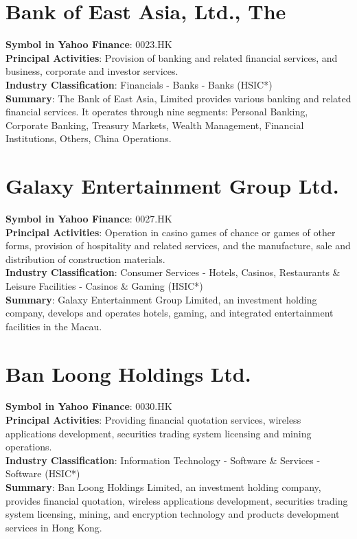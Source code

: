 \section{Bank of East Asia, Ltd., The}
\textbf{Symbol in Yahoo Finance}: 0023.HK\\
\textbf{Principal Activities}: Provision of banking and related financial services, and business, corporate and investor services.\\
\textbf{Industry Classification}: Financials - Banks - Banks (HSIC*)\\
\textbf{Summary}: The Bank of East Asia, Limited provides various banking and related financial services. It operates through nine segments: Personal Banking, Corporate Banking, Treasury Markets, Wealth Management, Financial Institutions, Others, China Operations.


\section{Galaxy Entertainment Group Ltd.}
\textbf{Symbol in Yahoo Finance}: 0027.HK\\
\textbf{Principal Activities}: Operation in casino games of chance or games of other forms, provision of hospitality and related services, and the manufacture, sale and distribution of construction materials.\\
\textbf{Industry Classification}: Consumer Services - Hotels, Casinos, Restaurants \& Leisure Facilities - Casinos \& Gaming (HSIC*)\\
\textbf{Summary}: Galaxy Entertainment Group Limited, an investment holding company, develops and operates hotels, gaming, and integrated entertainment facilities in the Macau.


\section{Ban Loong Holdings Ltd.}
\textbf{Symbol in Yahoo Finance}: 0030.HK\\
\textbf{Principal Activities}: Providing financial quotation services, wireless applications development, securities trading system licensing and mining operations.\\
\textbf{Industry Classification}: Information Technology - Software \& Services - Software (HSIC*)\\
\textbf{Summary}: Ban Loong Holdings Limited, an investment holding company, provides financial quotation, wireless applications development, securities trading system licensing, mining, and encryption technology and products development services in Hong Kong.


